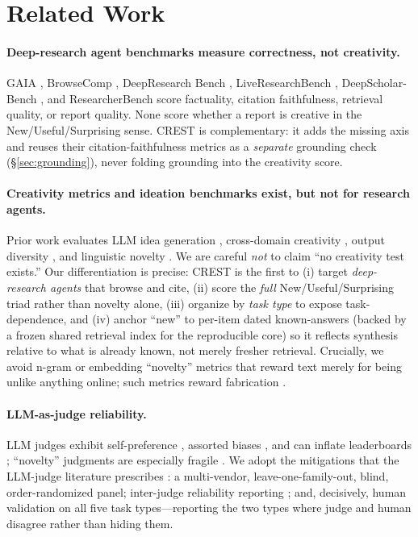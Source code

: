 \section{Related Work}
\label{sec:related}

\paragraph{Deep-research agent benchmarks measure correctness, not creativity.}
GAIA \citep{mialon2023gaia}, BrowseComp \citep{wei2025browsecomp}, DeepResearch Bench
\citep{du2025deepresearchbench}, LiveResearchBench \citep{liveresearchbench2025},
DeepScholar-Bench \citep{deepscholarbench2025}, and ResearcherBench \citep{researcherbench2025}
score factuality, citation faithfulness, retrieval quality, or report quality. None score whether
a report is creative in the New/Useful/Surprising sense. CREST is complementary: it adds the
missing axis and reuses their citation-faithfulness metrics as a \emph{separate} grounding
check (\S\ref{sec:grounding}), never folding grounding into the creativity score.

\paragraph{Creativity metrics and ideation benchmarks exist, but not for research agents.}
Prior work evaluates LLM idea generation \citep{si2024novel,ruan2024liveideabench}, cross-domain
creativity \citep{houcreativityprism2025}, output diversity \citep{zhang2025noveltybench}, and
linguistic novelty \citep{lu2024creativityindex}. We are careful \emph{not} to claim ``no
creativity test exists.'' Our differentiation is precise: CREST is the first to (i) target
\emph{deep-research agents} that browse and cite, (ii) score the \emph{full} New/Useful/Surprising
triad rather than novelty alone, (iii) organize by \emph{task type} to expose task-dependence, and
(iv) anchor ``new'' to per-item dated known-answers (backed by a frozen shared retrieval index for
the reproducible core) so it reflects synthesis relative to what is already known, not merely
fresher retrieval.
Crucially, we avoid n-gram or embedding ``novelty'' metrics that reward text merely for being
unlike anything online; such metrics reward fabrication \citep{saakyan2026death,lu2024creativityindex}.

\paragraph{LLM-as-judge reliability.} LLM judges exhibit self-preference
\citep{panickssery2024own}, assorted biases \citep{ye2024justice}, and can inflate leaderboards
\citep{singh2025leaderboard}; ``novelty'' judgments are especially fragile
\citep{sinhahajari2026mirage}. We adopt the mitigations that the LLM-judge literature prescribes
\citep{zheng2023mtbench}: a multi-vendor, leave-one-family-out, blind, order-randomized panel;
inter-judge reliability reporting \citep{hayes2007alpha,koo2016icc}; and, decisively, human
validation on all five task types---reporting the two types where judge and human disagree rather
than hiding them.

